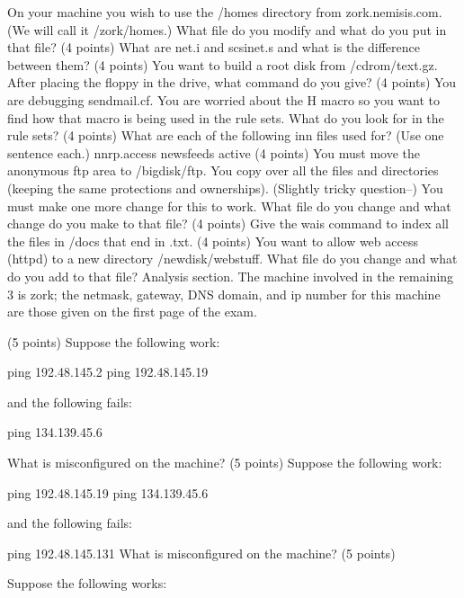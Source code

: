 On your machine you wish to use the {\ltt{}/homes} directory from
{\ltt{}zork.nemisis.com}. (We will call it {\ltt{}/zork/homes}.)
What file do you modify and what do you put in that file?
\vskip 1.0in
\ques
(4 points)
What are {\ltt{}net.i} and {\ltt{}scsinet.s} and what is the difference
between them?
\vskip 1.0in
\ques
(4 points)
You want to build a root disk from {\ltt{}/cdrom/text.gz}.
After placing the floppy in the drive,
what command do you give?
\vskip 0.7in
\ques
(4 points)
You are debugging {\ltt{}sendmail.cf}. You are worried about the {\ltt{}H}
macro so you want to find how that macro is being used in the rule sets.
What do you look for in the rule sets?
\vfill\eject
\ques
(4 points)
What are each of the following {\ltt{}inn} files used for?
(Use one sentence each.)
\hfill\break
{\ltt{}nnrp.access}
\vskip 0.7in
{\ltt{}newsfeeds}
\vskip 0.7in
{\ltt{}active}
\vskip 0.7in
\ques
(4 points)
You must move the anonymous ftp area to {\ltt{}/bigdisk/ftp}.
You copy over all the files and directories (keeping the same protections
and ownerships).
(Slightly tricky question--)
You must make one more change for this to work.
What file do you change and what change do you make to that file?
\vskip 0.7in
\ques
(4 points)
Give the wais command to index all the files in {\ltt{}/docs} that end
in {\ltt{}.txt}.
\vskip 0.7in
\ques
(4 points)
You want to allow web access (httpd) to a new directory 
{\ltt{}/newdisk/webstuff}.
What file do you change and what do you add to that file?
\vfill\eject
Analysis section. The machine involved in the remaining 3 is 
{\ltt{}zork}; the netmask, gateway, DNS domain, and ip number for this
machine are those given on the first page of the exam.

\ques
(5 points)
Suppose the following work:

{\program
 ping 192.48.145.2
 ping 192.48.145.19
\endprogram}

and the following fails:

{\program
 ping 134.139.45.6
\endprogram}

What is misconfigured on the machine?
\vskip 1.1in
\ques
(5 points)
Suppose the following work:

{\program
 ping 192.48.145.19
 ping 134.139.45.6
\endprogram}

and the following fails:

{\program
 ping 192.48.145.131
\endprogram}
What is misconfigured on the machine?
\vskip 1.1in
\ques
(5 points)

Suppose the following works:

